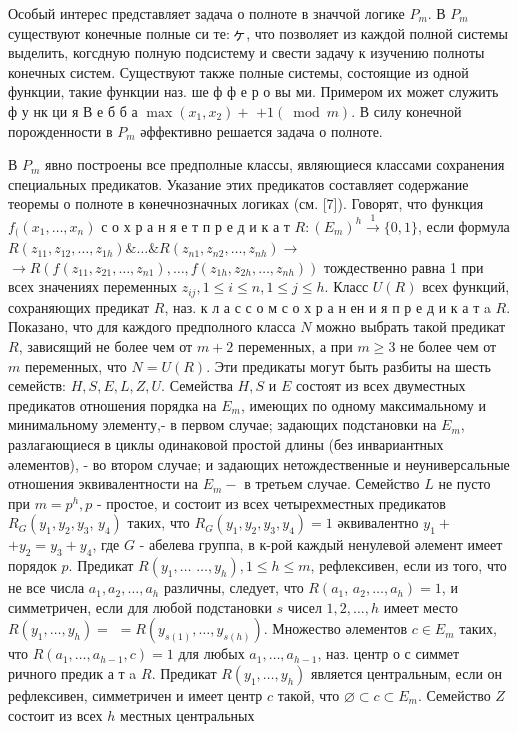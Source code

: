 \documentclass[10pt]{article}
\begin{document}
Особый интерес представляет задача о полноте в значчой логике $P_{m}$. В $P_{m}$ существуют конечные полные си $т е: ヶ$, что позволяет из каждой полной системы выделить, когсдную полную подсистему и свести задачу к изучению полноты конечных систем. Существуют также полные системы, состоящие из одной функции, такие функции наз. ше ф ф е р о вы ми. Примером их может служить ф у нк ци я В е б б а $\max \left(x_{1}, x_{2}\right)+$ $+1(\bmod m)$. В силу конечной порожденности в $P_{m}$ әффективно решается задача о полноте.



В $P_{m}$ явно построены все предполные классы, являющиеся классами сохранения специальных предикатов. Указание этих предикатов составляет содержание теоремы о полноте в көнечнозначных логиках (см. [7]). Говорят, что функция $f_{(}\left(x_{1}, \ldots, x_{n}\right)$ с о х р а н я е т п р е д и к а т $R:\left(E_{m}\right)^{h} \stackrel{1}{\rightarrow}\{0,1\}$, если формула $R\left(z_{11}, z_{12}, \ldots, z_{1 h}\right) \& \ldots \& R\left(z_{n 1}, z_{n 2}, \ldots, z_{n h}\right) \rightarrow$ $\longrightarrow R\left(f\left(z_{11}, z_{21}, \ldots, z_{n 1}\right), \ldots, f\left(z_{1 h}, z_{2 h}, \ldots, z_{n h}\right)\right)$ тождественно равна 1 при всех значениях переменных $z_{i j}, 1 \leqslant i \leqslant n, 1 \leqslant j \leqslant h$. Класс $U(R)$ всех функций, сохраняющих предикат $R$, наз. к л а с с о м с о х р а н ен и я п р е д и к а т a $R$. Показано, что для каждого предполного класса $N$ можно выбрать такой предикат $R$, зависящий не более чем от $m+2$ переменных, а при $m \geqslant 3$ не более чем от $m$ переменных, что $N=U(R)$. Эти предикаты могут быть разбиты на шесть семейств: $H, S, E, L, Z, U$. Семейства $H, S$ и $E$ состоят из всех двуместных предикатов отношения порядка на $E_{m}$, имеющих по одному максимальному и минимальному элементу,- в первом случае; задающих подстановки на $E_{m}$, разлагающиеся в циклы одинаковой простой длины (без инвариантных әлементов), - во втором случае; и задающих нетождественные и неуниверсальные отношения эквивалентности на $E_{m}-$ в третьем случае. Семейство $L$ не пусто при $m=p^{h}, p$ - простое, и состоит из всех четырехместных предикатов $R_{G}\left(y_{1}, y_{2}, y_{3}\right.$, $\left.y_{4}\right)$ таких, что $R_{G}\left(y_{1}, y_{2}, y_{3}, y_{4}\right)=1$ әквивалентно $y_{1}+$ $+y_{2}=y_{3}+y_{4}$, где $G$ - абелева группа, в к-рой каждый ненулевой әлемент имеет порядок $p$. Предикат $R\left(y_{1}, \ldots\right.$ $\left.\ldots, y_{h}\right), 1 \leqslant h \leqslant m$, рефлексивен, если из того, что не все числа $a_{1}, a_{2}, \ldots, a_{h}$ различны, следует, что $R\left(a_{1}\right.$, $\left.a_{2}, \ldots, a_{h}\right)=1$, и симметричен, если для любой подстановки $s$ чисел $1,2, \ldots, h$ имеет место $R\left(y_{1}, \ldots, y_{h}\right)=$ $=R\left(y_{s(1)}, \ldots, y_{s(h)}\right)$. Множество әлементов $c \in E_{m}$ таких, что $R\left(a_{1}, \ldots, a_{h-1}, c\right)=1$ для любых $a_{1}, \ldots, a_{h-1}$, наз. центр о с симмет ричного предик а т a $R$. Предикат $R\left(y_{1}, \ldots, y_{h}\right)$ является центральным, если он рефлексивен, симметричен и имеет центр $c$ такой, что $\varnothing \subset c \subset E_{m}$. Семейство $Z$ состоит из всех $h$ местных центральных 
\end{document}
